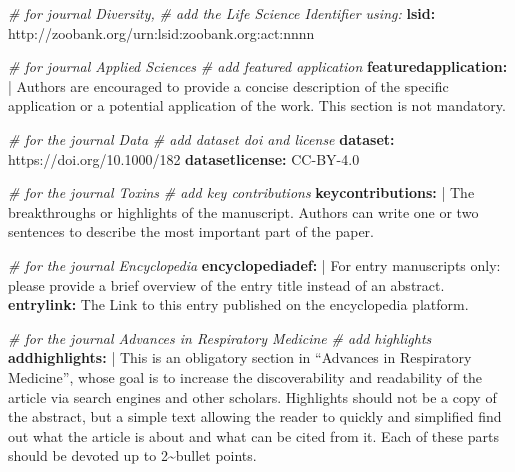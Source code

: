 \documentclass[atmosphere,article,submit,moreauthors,pdftex]{Definitions/mdpi}
\newenvironment{Shaded}{\begin{snugshade}}{\end{snugshade}}
\newcommand{\AttributeTok}[1]{\textcolor[rgb]{0.13,0.29,0.53}{#1}}
\newcommand{\CharTok}[1]{\textcolor[rgb]{0.31,0.60,0.02}{#1}}
\newcommand{\CommentTok}[1]{\textcolor[rgb]{0.56,0.35,0.01}{\textit{#1}}}
\newcommand{\FunctionTok}[1]{\textcolor[rgb]{0.13,0.29,0.53}{\textbf{#1}}}
\newcommand{\KeywordTok}[1]{\textcolor[rgb]{0.13,0.29,0.53}{\textbf{#1}}}
\newcommand{\NormalTok}[1]{#1}
\begin{document}
\begin{Shaded}
\begin{Highlighting}[]
\CommentTok{\# for journal Diversity,}
\CommentTok{\# add the Life Science Identifier using:}
\FunctionTok{lsid}\KeywordTok{:}\AttributeTok{ http://zoobank.org/urn:lsid:zoobank.org:act:nnnn}


\CommentTok{\# for journal Applied Sciences}
\CommentTok{\# add featured application}
\FunctionTok{featuredapplication}\KeywordTok{: }\CharTok{|}
\NormalTok{  Authors are encouraged to provide a concise }
\NormalTok{  description of the specific application or }
\NormalTok{  a potential application of the work. This }
\NormalTok{  section is not mandatory.}

\CommentTok{\# for the journal Data}
\CommentTok{\# add dataset doi and license}
\FunctionTok{dataset}\KeywordTok{:}\AttributeTok{ https://doi.org/10.1000/182}
\FunctionTok{datasetlicense}\KeywordTok{:}\AttributeTok{ CC{-}BY{-}4.0}

\CommentTok{\# for the journal Toxins}
\CommentTok{\# add key contributions}
\FunctionTok{keycontributions}\KeywordTok{: }\CharTok{|}
\NormalTok{  The breakthroughs or highlights of the manuscript. }
\NormalTok{  Authors can write one or two sentences to describe }
\NormalTok{  the most important part of the paper.}

\CommentTok{\# for the journal Encyclopedia}
\FunctionTok{encyclopediadef}\KeywordTok{: }\CharTok{|}
\NormalTok{  For entry manuscripts only: please provide a brief overview}
\NormalTok{  of the entry title instead of an abstract.}
\FunctionTok{entrylink}\KeywordTok{:}\AttributeTok{ The Link to this entry published on the encyclopedia platform.}

\CommentTok{\# for the journal Advances in Respiratory Medicine}
\CommentTok{\# add highlights}
\FunctionTok{addhighlights}\KeywordTok{: }\CharTok{|}
\NormalTok{  This is an obligatory section in “Advances in Respiratory Medicine”, }
\NormalTok{  whose goal is to increase the discoverability and readability of the}
\NormalTok{  article via search engines and other scholars. Highlights should not }
\NormalTok{  be a copy of the abstract, but a simple text allowing the reader to }
\NormalTok{  quickly and simplified find out what the article is about and what can }
\NormalTok{  be cited from it. Each of these parts should be devoted up to 2\textasciitilde{}bullet }
\NormalTok{  points.}
\end{Highlighting}
\end{Shaded}
\end{document}
